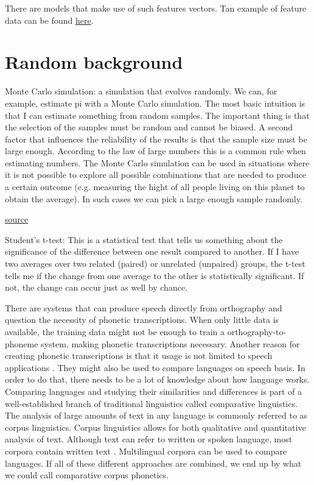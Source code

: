 There are models that make use of such features vectors. Tan example of feature data can be found \href{https://github.com/uiuc-sst/g2ps}{here}.




\section{Random background}
Monte Carlo simulation: a simulation that evolves randomly. We can, for example, estimate pi with a Monte Carlo simulation. The most basic intuition is that I can estimate something from random samples. The important thing is that the selection of the samples must be random and cannot be biased. A second factor that influences the reliability of the results is that the sample size must be large enough. According to the law of large numbers this is a common rule when estimating numbers. The Monte Carlo simulation can be used in situations where it is not possible to explore all possible combinations that are needed to produce a certain outcome (e.g. measuring the hight of all people living on this planet to obtain the average). In such cases we can pick a large enough sample randomly.

\href{https://www.youtube.com/watch?v=7ESK5SaP-bc}{source}

Student's t-test: This is a statistical test that tells us something about the significance of the difference between one result compared to another. If I have two  averages over two related (paired) or unrelated (unpaired) groups, the t-test tells me if the change from one average to the other is statistically significant. If not, the change can occur just as well by chance. 


There are systems that can produce speech directly from orthography and question the necessity of phonetic transcriptions. When only  little data is available, the training data might not be enough to train a orthography-to-phoneme system, making phonetic transcriptions necessary. Another reason for creating phonetic transcriptions is that it usage is not limited to speech applications \citep{mortensen-etal-2018-epitran}. They might also be used to compare languages on speech basis. In order to do that, there needs to be a lot of knowledge about how language works. Comparing languages and studying their similarities and differences is part of a well-established branch of traditional linguistics called comparative linguistics. The analysis of large amounts of text in any language is commonly referred to as corpus linguistics. Corpus linguistics allows for both qualitative and quantitative analysis of text. Although text can refer to written or spoken language, most corpora contain written text \citep{McEnery&Hardie.2011}. Multilingual corpora can be used to compare languages. If all of these different approaches are combined, we end up by what we could call comparative corpus phonetics. 





